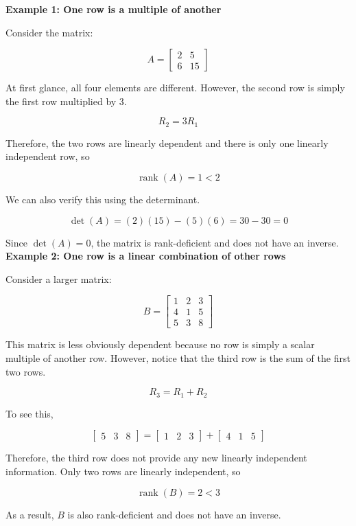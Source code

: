 \documentclass[12pt]{article}
\begin{document}
\textbf{Example 1: One row is a multiple of another}

Consider the matrix:

\[
A =
\begin{bmatrix}
2 & 5 \\
6 & 15
\end{bmatrix}
\]

At first glance, all four elements are different. However, the second row is simply the first row multiplied by 3.

\[
R_2 = 3R_1
\]

Therefore, the two rows are linearly dependent and there is only one linearly independent row, so

\[
\operatorname{rank}(A) = 1 < 2
\]

We can also verify this using the determinant.

\[
\det(A) = (2)(15) - (5)(6) = 30 - 30 = 0
\]

Since $\det(A) = 0$, the matrix is rank-deficient and does not have an inverse.\\

\textbf{Example 2: One row is a linear combination of other rows}

Consider a larger matrix:

\[
B =
\begin{bmatrix}
1 & 2 & 3 \\
4 & 1 & 5 \\
5 & 3 & 8
\end{bmatrix}
\]

This matrix is less obviously dependent because no row is simply a scalar multiple of another row. However, notice that the third row is the sum of the first two rows.

\[
R_3 = R_1 + R_2
\]

To see this,

\[
\begin{bmatrix}
5 & 3 & 8
\end{bmatrix}
=
\begin{bmatrix}
1 & 2 & 3
\end{bmatrix}
+
\begin{bmatrix}
4 & 1 & 5
\end{bmatrix}
\]

Therefore, the third row does not provide any new linearly independent information. Only two rows are linearly independent, so

\[
\operatorname{rank}(B) = 2 < 3
\]

As a result, $B$ is also rank-deficient and does not have an inverse.\\
\end{document}
